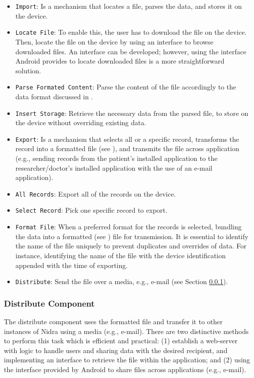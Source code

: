 \begin{itemize}
    \item[2.1] \verb|Import|: Is a mechanism that locates a file, parses the data, and stores it on the device.
    \item[2.1.1] \verb|Locate File|: To enable this, the user has to download the file on the device. Then, locate the file on the device by using an interface to browse downloaded files. An interface can be developed; however, using the interface Android provides to locate downloaded files is a more straightforward solution.
    \item[2.1.2] \verb|Parse Formated Content|: Parse the content of the file accordingly to the data format discussed in .
    \item[2.1.3] \verb|Insert Storage|: Retrieve the necessary data from the parsed file, to store on the device without overriding existing data.   
    \item[2.2] \verb|Export|: Is a mechanism that selects all or a specific record, transforms the record into a formatted file (see ), and transmits the file across application (e.g., sending records from the patient's installed application to the researcher/doctor's installed application with the use of an e-mail application). 
    \item[2.2.1.1] \verb|All Records|: Export all of the records on the device.
    \item[2.2.1.2] \verb|Select Record|: Pick one specific record to export. 
    \item[2.2.2] \verb|Format File|: When a preferred format for the records is selected, bundling the data into a formatted (see ) file for transmission. It is essential to identify the name of the file uniquely to prevent duplicates and overrides of data. For instance, identifying the name of the file with the device identification appended with the time of exporting. 
    \item[2.2.3] \verb|Distribute|: Send the file over a media, e.g., e-mail (see Section \ref{des:distro}).
\end{itemize}

\subsubsection{Distribute Component}\label{des:distro}
The distribute component uses the formatted file and transfer it to other instances of Nidra using a media (e.g., e-mail). There are two distinctive methods to perform this task which is efficient and practical: (1) establish a web-server with logic to handle users and sharing data with the desired recipient, and implementing an interface to retrieve the file within the application; and (2) using the interface provided by Android to share files across applications (e.g., e-mail). 

